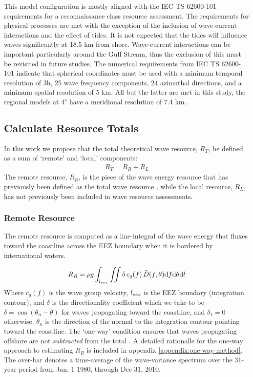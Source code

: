 This model configuration is mostly aligned with the IEC TS 62600-101 requirements for a reconnaissance class resource assessment. The requirements for physical processes are met with the exception of the inclusion of wave-current interactions and the effect of tides. It is not expected that the tides will influence waves significantly at 18.5 km from shore. Wave-current interactions can be important particularly around the Gulf Stream, thus the exclusion of this must be revisited in future studies. The numerical requirements from IEC TS 62600-101 indicate that spherical coordinates must be used with a minimum temporal resolution of 3h, 25 wave frequency components, 24 azimuthal directions, and a minimum spatial resolution of 5 km. All but the latter are met in this study, the regional models at 4" have a meridional resolution of 7.4 km.


\subsection{Calculate Resource Totals} \label{sec:method:calc}

In this work we propose that the total theoretical wave resource, $R_T$, be defined as a sum of `remote' and `local' components:
\begin{align}
  R_T = R_R + R_L
\end{align}
The remote resource, $R_R$, is the piece of the wave energy resource that has previously been defined as the total wave resource \citep{gunnQuantifyingGlobalWave2012,EPRIwaveresource2011}, while the local resource, $R_L$, has not previously been included in wave resource assessments.

\subsubsection{Remote Resource} \label{sec:method:calc:remote}

The remote resource is computed as a line-integral of the wave energy that fluxes toward the coastline across the EEZ boundary when it is bordered by international waters. 

\begin{align}
  R_R = \rho g \int_{l_{eez}}\iint \delta \, c_g(f) \, \bar{D}(f,\theta) \mathrm{d} f \mathrm{d} \theta \mathrm{d} l
\label{eqn:RR}
\end{align}
Where $c_g(f)$ is the wave group velocity, $l_{eez}$ is the EEZ boundary (integration contour), and $\delta$ is the directionality coefficient which we take to be $\delta = \cos(\theta_n - \theta)$ for waves propagating toward the coastline, and $\delta_1 = 0$ otherwise. $\theta_n$ is the direction of the normal to the integration contour pointing toward the coastline. The `one-way' condition ensures that waves propagating offshore are not {\em subtracted} from the total \citep[]{gunnQuantifyingGlobalWave2012}. A detailed rationalle for the one-way approach to estimating $R_R$ is included in appendix \ref{appendix:one-way-method}. The over-bar denotes a time-average of the wave-variance spectrum over the 31-year period from Jan. 1 1980, through Dec 31, 2010.


